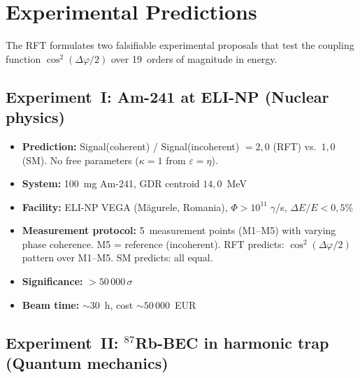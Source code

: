 \documentclass[a4paper,11pt]{article}
\begin{document}
	\section{Experimental Predictions}
	
	The RFT formulates two falsifiable experimental proposals
	that test the coupling function $\cos^2(\Delta\varphi/2)$ over
	19~orders of magnitude in energy.
	
	\subsection{Experiment~I: Am-241 at ELI-NP (Nuclear physics)}
	
	\begin{itemize}
		\item \textbf{Prediction:}
		Signal(coherent) / Signal(incoherent) $= 2{,}0$
		(RFT) vs.\ $1{,}0$ (SM). No free parameters
		($\kappa = 1$ from $\varepsilon = \eta$).
		\item \textbf{System:} 100~mg Am-241,
		GDR centroid $14{,}0$~MeV
		\item \textbf{Facility:} ELI-NP VEGA
		(M\u{a}gurele, Romania),
		$\Phi > 10^{11}\;\gamma$/s,
		$\Delta E/E < 0{,}5\%$
		\item \textbf{Measurement protocol:} 5~measurement points (M1--M5)
		with varying phase coherence. M5 = reference
		(incoherent). RFT predicts:
		$\cos^2(\Delta\varphi/2)$ pattern over M1--M5.
		SM predicts: all equal.
		\item \textbf{Significance:} $> 50\,000\,\sigma$
		\item \textbf{Beam time:} ${\sim}30$~h,
		cost ${\sim}50\,000$~EUR
	\end{itemize}
	
	\subsection{Experiment~II: ${}^{87}$Rb-BEC in harmonic
		trap (Quantum mechanics)}
	
\end{document}

